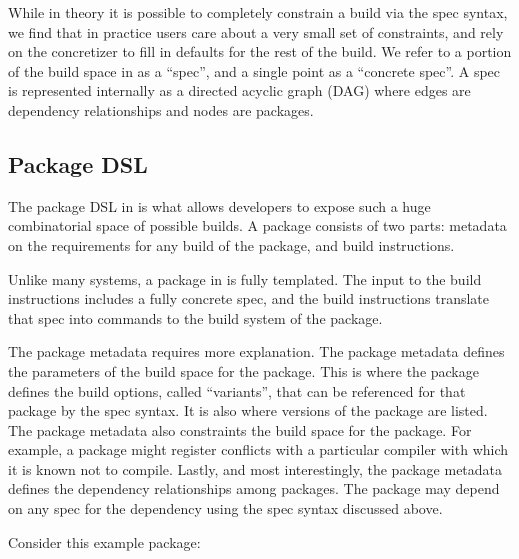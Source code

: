 While in theory it is possible to completely constrain a build via the spec syntax, we find that in practice users care about a very small set of constraints, and rely on the concretizer to fill in defaults for the rest of the build. We refer to a portion of the build space in \spack as a ``spec'', and a single point as a ``concrete spec''. A spec is represented internally as a directed acyclic graph (DAG) where edges are dependency relationships and nodes are packages.

\subsection{Package DSL}

The package DSL in \spack is what allows developers to expose such a huge combinatorial space of possible builds.
A \spack package consists of two parts: metadata on the requirements for any build of the package, and build instructions.

Unlike many systems, a package in \spack is fully templated.
The input to the build instructions includes a fully concrete spec, and the build instructions translate that spec into commands to the build system of the package.

The package metadata requires more explanation.
The package metadata defines the parameters of the build space for the package.
This is where the package defines the build options, called ``variants'', that can be referenced for that package by the spec syntax.
It is also where versions of the package are listed.
The package metadata also constraints the build space for the package. For example, a package might register conflicts with a particular compiler with which it is known not to compile.
Lastly, and most interestingly, the package metadata defines the dependency relationships among packages.
The package may depend on any spec for the dependency using the spec syntax discussed above.

Consider this example package:

